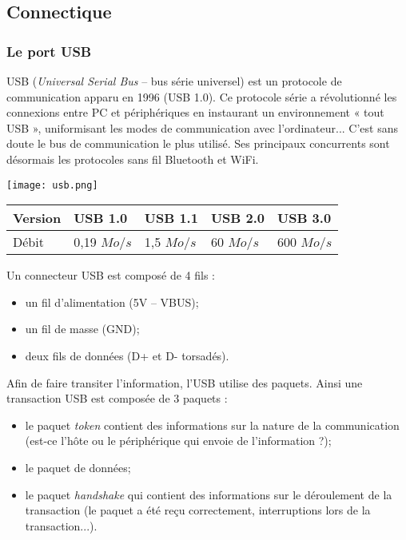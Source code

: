 \subsection{Connectique}
\subsubsection{Le port USB \cite{usb}}

\noindent \begin{minipage}[c]{.75\linewidth}
USB (\textit{Universal Serial Bus} -- bus série universel) est un protocole de communication apparu en 1996 (USB 1.0). Ce protocole série a révolutionné les connexions entre PC et périphériques en instaurant un environnement « tout USB », uniformisant les modes de communication avec l'ordinateur... C'est sans doute le bus de communication le plus utilisé. Ses principaux concurrents sont désormais les protocoles sans fil Bluetooth et WiFi.
\end{minipage}\hfill
\begin{minipage}[c]{.2\linewidth}
\begin{center}
\texttt{[image: usb.png]}
\end{center}
\end{minipage}

\begin{center}
\begin{tabular}{|l|l|l|l|l|}
\hline
Version & USB 1.0 & USB 1.1 & USB 2.0 & USB 3.0 \\ \hline
Débit   & 0,19 $Mo/s$ & 1,5 $Mo/s$ & 60 $Mo/s$ & 600 $Mo/s$  \\ \hline
\end{tabular}
\end{center}

Un connecteur USB est composé de 4 fils : 
\begin{itemize}
\item un fil d'alimentation (5V -- VBUS);
\item un fil de masse (GND);
\item deux fils de données (D+ et D- torsadés). 
\end{itemize}

Afin de faire transiter l'information, l'USB utilise des paquets. Ainsi une transaction USB est composée de 3 paquets :
\begin{itemize}
\item le paquet \textit{token} contient des informations sur la nature de la communication (est-ce l'hôte ou le périphérique qui envoie de l'information ?);
\item le paquet de données;
\item le paquet \textit{handshake} qui contient des informations sur le déroulement de la transaction (le paquet a été reçu correctement, interruptions lors de la transaction...).
\end{itemize}


